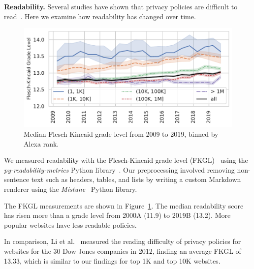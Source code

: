 
\newcommand{\medianFKStart}{11.9}
\newcommand{\medianFKEnd}{13.2}
{\bf Readability.}
\label{sec:readability}
Several studies have shown that privacy policies are difficult to read~\cite{mcdonald2008cost,fabian2017large,milne2006longitudinal,li2012online}. 
Here we examine how readability has changed over time.
\begin{figure}
\centering
\includegraphics[width=1\columnwidth]{figures/flesch_kincaid_dist.pdf}
\caption{Median Flesch-Kincaid grade level from 2009 to 2019, binned by Alexa rank. 
}
\label{fig:readability}
\end{figure}
We measured readability with the Flesch-Kincaid grade level (FKGL)~\cite{kincaid1975derivation}
using the \textit{py-readability-metrics} Python library~\cite{pyreadabilitymetrics}.
Our preprocessing involved removing non-sentence text such as headers, tables, and lists by writing a custom Markdown renderer using the \emph{Mistune}~\cite{mistune} Python library.

The FKGL measurements are shown in Figure~\ref{fig:readability}. The median readability score has risen more than a grade level from 2000A (\medianFKStart) to 2019B (\medianFKEnd). More popular websites have less readable policies.

In comparison, Li et al.~\cite{li2012online} measured the reading difficulty of privacy policies for websites for the 30 Dow Jones companies in 2012, finding an average FKGL of 13.33, which is similar to our findings for top 1K and top 10K websites.
